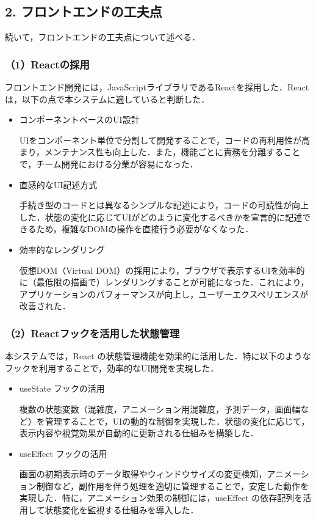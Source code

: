 \subsection*{2. フロントエンドの工夫点}

続いて，フロントエンドの工夫点について述べる．

\subsubsection*{（1）Reactの採用}
フロントエンド開発には，JavaScriptライブラリであるReactを採用した．Reactは，以下の点で本システムに適していると判断した．

\begin{itemize}
	\item コンポーネントベースのUI設計
	
	UIをコンポーネント単位で分割して開発することで，コードの再利用性が高まり，メンテナンス性も向上した．また，機能ごとに責務を分離することで，チーム開発における分業が容易になった．
	
	\item 直感的なUI記述方式
	
	手続き型のコードとは異なるシンプルな記述により，コードの可読性が向上した．状態の変化に応じてUIがどのように変化するべきかを宣言的に記述できるため，複雑なDOMの操作を直接行う必要がなくなった．
	
	\item 効率的なレンダリング
	
	仮想DOM（Virtual DOM）の採用により，ブラウザで表示するUIを効率的に（最低限の描画で）レンダリングすることが可能になった．これにより，アプリケーションのパフォーマンスが向上し，ユーザーエクスペリエンスが改善された．
\end{itemize}

\subsubsection*{（2）Reactフックを活用した状態管理}
本システムでは，React の状態管理機能を効果的に活用した．特に以下のようなフックを利用することで，効率的なUI開発を実現した．

\begin{itemize}
	\item useState フックの活用
	
	複数の状態変数（混雑度，アニメーション用混雑度，予測データ，画面幅など）を管理することで，UIの動的な制御を実現した．状態の変化に応じて，表示内容や視覚効果が自動的に更新される仕組みを構築した．
	
	\item useEffect フックの活用
	
	画面の初期表示時のデータ取得やウィンドウサイズの変更検知，アニメーション制御など，副作用を伴う処理を適切に管理することで，安定した動作を実現した．特に，アニメーション効果の制御には，useEffect の依存配列を活用して状態変化を監視する仕組みを導入した．
\end{itemize}

